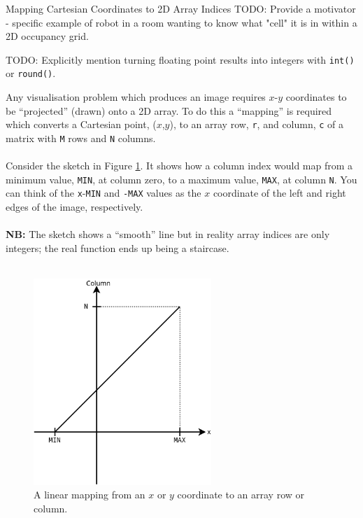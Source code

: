 \documentclass{lab}
\begin{document}
\pagebreak
\begin{task}{Mapping Cartesian Coordinates to 2D Array Indices}{}
TODO: Provide a motivator - specific example of robot in a room wanting to know what "cell" it is in within a 2D occupancy grid.

TODO: Explicitly mention turning floating point results into integers with \texttt{int()} or \texttt{round()}.

Any visualisation problem which produces an image requires $x$-$y$ coordinates to be ``projected'' (drawn) onto a 2D array. To do this a ``mapping'' is required which converts a Cartesian point, ($x$,$y$), to an array row, \texttt{r}, and column, \texttt{c} of a matrix with \texttt{M} rows and \texttt{N} columns.
\\~\\
Consider the sketch in Figure \ref{fig:mapping}. It shows how a column index would map from a minimum value, \texttt{MIN}, at column zero, to a maximum value, \texttt{MAX}, at column \texttt{N}. You can think of the \texttt{x}-\texttt{MIN} and \texttt{-MAX} values as the $x$ coordinate of the left and right edges of the image, respectively.
\\~\\
\textbf{NB:} The sketch shows a ``smooth'' line but in reality array indices are only integers; the real function ends up being a staircase.
\\~\\
\begin{figure}[H]
\begin{center}
\includegraphics[width=0.6\textwidth]{mapping.png}
\end{center}
\caption{A linear mapping from an $x$ or $y$ coordinate to an array row or column.}\label{fig:mapping}

\end{figure}
\end{task}
\end{document}

